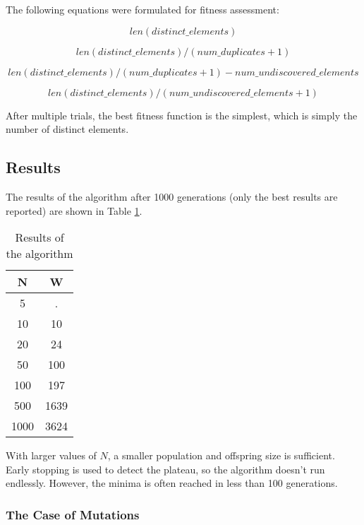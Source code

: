 The following equations were formulated for fitness assessment:

\begin{equation}
  len(distinct\_elements)
\end{equation}

\begin{equation}
  len(distinct\_elements) / (num\_duplicates + 1)
\end{equation}

\begin{equation}
  len(distinct\_elements) / (num\_duplicates + 1) - num\_undiscovered\_elements
\end{equation}

\begin{equation}
  len(distinct\_elements) / (num\_undiscovered\_elements + 1)
\end{equation}

After multiple trials, the best fitness function is the simplest, which is simply the number of distinct elements.

\subsection{Results}

The results of the algorithm after 1000 generations (only the best results are reported) are shown in Table \ref{table:results}.

\begin{table}
  \centering
  \begin{tabular}{|c|c|}
    \hline
    N & W \\
    \hline
    5 & . \\
    10 & 10 \\
    20 & 24 \\
    50 & 100 \\
    100 & 197 \\
    500 & 1639 \\
    1000 & 3624 \\
    \hline
  \end{tabular}
  \caption{Results of the algorithm}
  \label{table:results}
\end{table}

With larger values of $N$, a smaller population and offspring size is sufficient. Early stopping is used to detect the plateau, so the algorithm doesn't run endlessly. However, the minima is often reached in less than 100 generations.

\subsubsection{The Case of Mutations}

